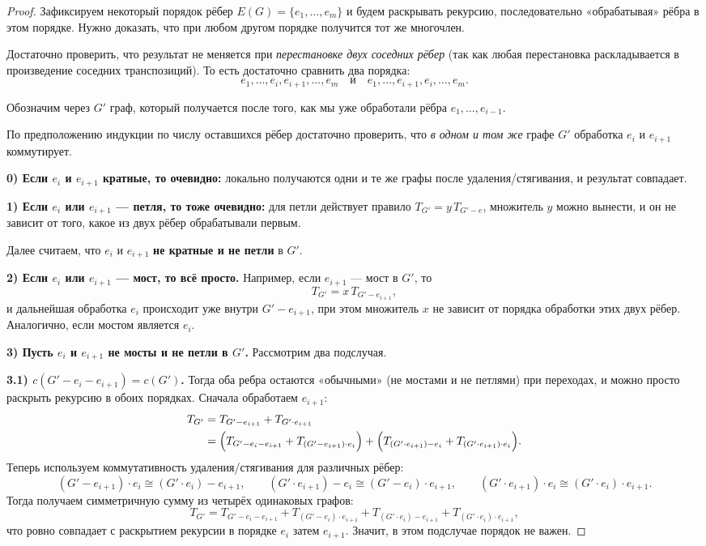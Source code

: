 \begin{proof}
	Зафиксируем некоторый порядок рёбер $E(G)=\{e_1,\dots,e_m\}$ и будем раскрывать рекурсию,
	последовательно «обрабатывая» рёбра в этом порядке.
	Нужно доказать, что при любом другом порядке получится тот же многочлен.
	
	Достаточно проверить, что результат не меняется при \emph{перестановке двух соседних рёбер}
	(так как любая перестановка раскладывается в произведение соседних транспозиций).
	То есть достаточно сравнить два порядка:
	\[
	e_1,\dots,e_i,e_{i+1},\dots,e_m
	\quad\text{и}\quad
	e_1,\dots,e_{i+1},e_i,\dots,e_m.
	\]
	
	Обозначим через $G'$ граф, который получается после того, как мы уже обработали рёбра
	$e_1,\dots,e_{i-1}$.
	
	По предположению индукции по числу оставшихся рёбер
	достаточно проверить, что \emph{в одном и том же} графе $G'$ обработка $e_i$ и $e_{i+1}$
	коммутирует.
	
	\medskip
	\noindent\textbf{0) Если $e_i$ и $e_{i+1}$ кратные, то очевидно:}
	локально получаются одни и те же графы после удаления/стягивания,
	и результат совпадает.
	
	\smallskip
	\noindent\textbf{1) Если $e_i$ или $e_{i+1}$ — петля, то тоже очевидно:}
	для петли действует правило $T_{G'}=y\,T_{G'-e}$, множитель $y$ можно вынести,
	и он не зависит от того, какое из двух рёбер обрабатывали первым.
	
	\medskip
	Далее считаем, что $e_i$ и $e_{i+1}$ \textbf{не кратные и не петли} в $G'$.
	
	\medskip
	\noindent\textbf{2) Если $e_i$ или $e_{i+1}$ — мост, то всё просто.}
	Например, если $e_{i+1}$ — мост в $G'$, то
	\[
	T_{G'}=x\,T_{G'-e_{i+1}},
	\]
	и дальнейшая обработка $e_i$ происходит уже внутри $G'-e_{i+1}$, при этом множитель $x$
	не зависит от порядка обработки этих двух рёбер. Аналогично, если мостом является $e_i$.
	
	\medskip
	\noindent\textbf{3) Пусть $e_i$ и $e_{i+1}$ не мосты и не петли в $G'$.}
	Рассмотрим два подслучая.
	
	\smallskip
	\noindent\textbf{3.1) $c(G'-e_i-e_{i+1})=c(G')$.}
	Тогда оба ребра остаются «обычными» (не мостами и не петлями) при переходах,
	и можно просто раскрыть рекурсию в обоих порядках.
	Сначала обработаем $e_{i+1}$:
	\begin{align*}
		T_{G'}
		&=T_{G'-e_{i+1}}+T_{G'\cdot e_{i+1}}\\
		&=\Bigl(T_{G'-e_i-e_{i+1}}+T_{(G'-e_{i+1})\cdot e_i}\Bigr)
		+\Bigl(T_{(G'\cdot e_{i+1})-e_i}+T_{(G'\cdot e_{i+1})\cdot e_i}\Bigr).
	\end{align*}
	Теперь используем коммутативность удаления/стягивания для различных рёбер:
	\[
	(G'-e_{i+1})\cdot e_i \cong (G'\cdot e_i)-e_{i+1},\qquad
	(G'\cdot e_{i+1})-e_i \cong (G'-e_i)\cdot e_{i+1},\qquad
	(G'\cdot e_{i+1})\cdot e_i \cong (G'\cdot e_i)\cdot e_{i+1}.
	\]
	Тогда получаем симметричную сумму из четырёх одинаковых графов:
	\[
	T_{G'}
	=
	T_{G'-e_i-e_{i+1}}
	+T_{(G'-e_i)\cdot e_{i+1}}
	+T_{(G'\cdot e_i)-e_{i+1}}
	+T_{(G'\cdot e_i)\cdot e_{i+1}},
	\]
	что ровно совпадает с раскрытием рекурсии в порядке $e_i$ затем $e_{i+1}$.
	Значит, в этом подслучае порядок не важен.
	

\end{proof}

